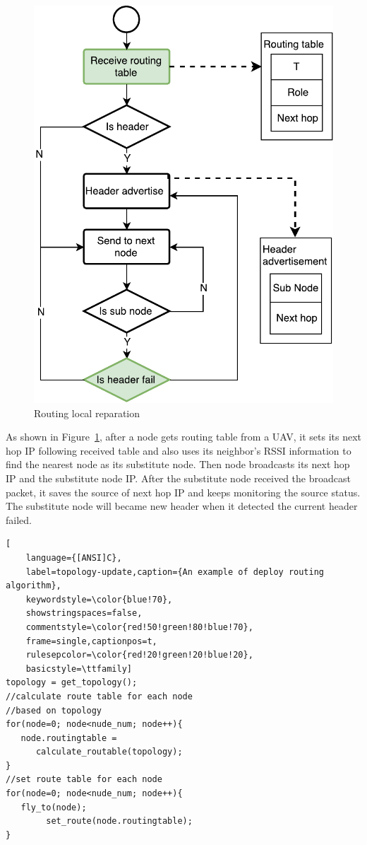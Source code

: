 \begin{figure}[htbp]
	\centering
	\includegraphics[width=.65\columnwidth]{Figure/routing-flow}
	\vspace{-0.1in}
	\caption{Routing local reparation}
	\label{routing-flow}
	\vspace{-0.1in}
\end{figure}

As shown in Figure~\ref{routing-flow}, after a node gets routing table from
a UAV, it sets its next hop IP following received table and also uses its
neighbor's RSSI information to find the nearest node as its substitute node.
Then node broadcasts its next hop IP and the substitute node IP. After the substitute
node received the broadcast packet, it saves the source of next hop IP and keeps
monitoring the source status. The substitute node will became new header when it
detected the current header failed.

\begin{lstlisting}[
	language={[ANSI]C},
	label=topology-update,caption={An example of deploy routing algorithm},
	keywordstyle=\color{blue!70},
	showstringspaces=false,
	commentstyle=\color{red!50!green!80!blue!70},
	frame=single,captionpos=t,
	rulesepcolor=\color{red!20!green!20!blue!20},
	basicstyle=\ttfamily]
topology = get_topology();
//calculate route table for each node
//based on topology
for(node=0; node<nude_num; node++){
   node.routingtable =
      calculate_routable(topology);
}
//set route table for each node
for(node=0; node<nude_num; node++){
   fly_to(node);
        set_route(node.routingtable);
}

\end{lstlisting}



